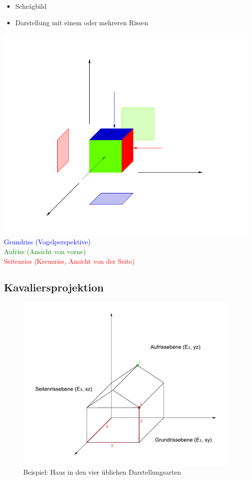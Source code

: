 \documentclass[12pt,a4paper]{scrbook}
\begin{document}
\begin{itemize}
  \item Schrägbild
  \item Darstellung mit einem oder mehreren Rissen
\end{itemize}

\includegraphics[scale=1]{img/einfuehrung.pdf}\\
\textcolor{blue}{Grundriss (Vogelperspektive)}\\
\textcolor{green}{Aufriss (Ansicht von vorne)}\\
\textcolor{red}{Seitenriss (Kreuzriss, Ansicht von der Seite)}

\subsection{Kavaliersprojektion}
\begin{figure}[h]
  \includegraphics[scale=1.4]{img/DGeinfuehrung_2.pdf}
  \caption{Beispiel: Haus in den vier üblichen Darstellungsarten}
\end{figure}
\end{document}
